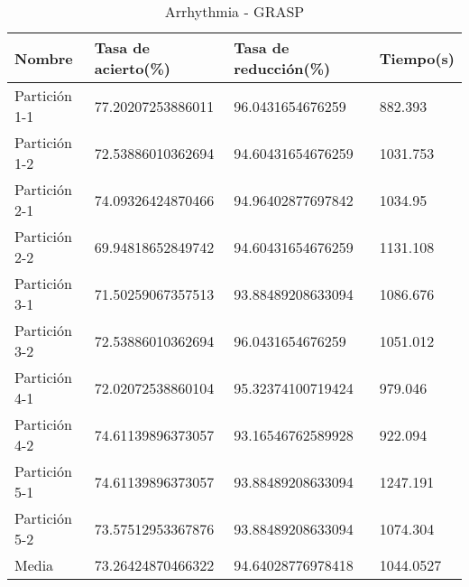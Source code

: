 \begin{table}[H]
	\centering
	\begin{tabular}{l|lll}
		Nombre        & Tasa de acierto(\%) & Tasa de reducción(\%) & Tiempo(s) \\ \hline
		Partición 1-1 & 77.20207253886011   & 96.0431654676259      & 882.393   \\
		Partición 1-2 & 72.53886010362694   & 94.60431654676259     & 1031.753  \\
		Partición 2-1 & 74.09326424870466   & 94.96402877697842     & 1034.95   \\
		Partición 2-2 & 69.94818652849742   & 94.60431654676259     & 1131.108  \\
		Partición 3-1 & 71.50259067357513   & 93.88489208633094     & 1086.676  \\
		Partición 3-2 & 72.53886010362694   & 96.0431654676259      & 1051.012  \\
		Partición 4-1 & 72.02072538860104   & 95.32374100719424     & 979.046   \\
		Partición 4-2 & 74.61139896373057   & 93.16546762589928     & 922.094   \\
		Partición 5-1 & 74.61139896373057   & 93.88489208633094     & 1247.191  \\
		Partición 5-2 & 73.57512953367876   & 93.88489208633094     & 1074.304  \\
		Media         & 73.26424870466322   & 94.64028776978418     & 1044.0527
	\end{tabular}
	\caption{Arrhythmia - GRASP}
	\label{ARRH-GRASP}
\end{table}